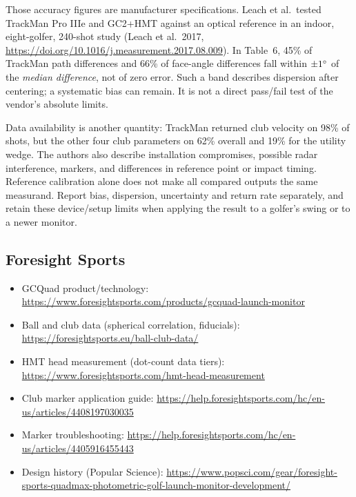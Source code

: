 \begin{warning}
Those accuracy figures are manufacturer specifications. Leach et al.\ tested
TrackMan Pro IIIe and GC2+HMT against an optical reference in an indoor,
eight-golfer, 240-shot study
(Leach et al.\ 2017,
\url{https://doi.org/10.1016/j.measurement.2017.08.009}). In Table~6,
45\% of TrackMan path differences and 66\% of face-angle differences fall
within $\pm1\si{\degree}$ of the \emph{median difference}, not of zero error.
Such a band describes dispersion after centering; a systematic bias can
remain. It is not a direct pass/fail test of the vendor's absolute limits.

Data availability is another quantity: TrackMan returned club velocity on
98\% of shots, but the other four club parameters on 62\% overall and
19\% for the utility wedge. The authors also describe installation
compromises, possible radar interference, markers, and differences in
reference point or impact timing. Reference calibration alone does not
make all compared outputs the same measurand. Report bias, dispersion,
uncertainty and return rate separately, and retain these device/setup limits
when applying the result to a golfer's swing or to a newer monitor.
\end{warning}

\subsection*{Foresight Sports}
\begin{itemize}\small
\item GCQuad product/technology:
  \url{https://www.foresightsports.com/products/gcquad-launch-monitor}
\item Ball and club data (spherical correlation, fiducials):
  \url{https://foresightsports.eu/ball-club-data/}
\item HMT head measurement (dot-count data tiers):
  \url{https://www.foresightsports.com/hmt-head-measurement}
\item Club marker application guide:
  \url{https://help.foresightsports.com/hc/en-us/articles/4408197030035}
\item Marker troubleshooting:
  \url{https://help.foresightsports.com/hc/en-us/articles/4405916455443}
\item Design history (Popular Science):
  \url{https://www.popsci.com/gear/foresight-sports-quadmax-photometric-golf-launch-monitor-development/}
\end{itemize}


